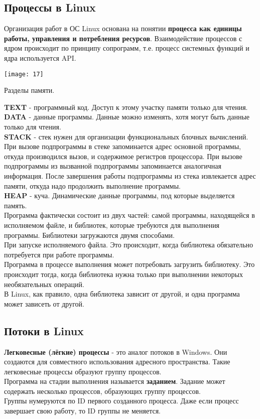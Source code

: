 \documentclass[a4paper]{article}
\begin{document}
\subsection{Процессы в Linux}
Организация работ в ОС Linux основана на понятии \textbf{процесса как единицы работы, управления и потребления ресурсов}. Взаимодействие процессов с ядром происходит по принципу сопрограмм, т.е. процесс системных функций и ядра используется API.\\
\begin{center}
	\texttt{[image: 17]}
\end{center}
\begin{center}
	Разделы памяти.
\end{center}
\textbf{TEXT} - программный код. Доступ к этому участку памяти только для чтения.\\
\textbf{DATA} - данные программы. Данные можно изменять, хотя  могут быть данные только для чтения.\\
\textbf{STACK} - стек нужен для организации функциональных блочных вычислений. При вызове подпрограммы в стеке запоминается адрес основной программы, откуда производился вызов, и содержимое регистров процессора. При вызове подпрограммы из вызванной подпрограммы запоминается аналогичная информация. После завершения работы подпрограммы из стека извлекается адрес памяти, откуда надо продолжить выполнение программы.\\
\textbf{HEAP} - куча. Динамические данные программы, под которые выделяется память.\\
Программа фактически состоит из двух частей: самой программы, находящейся в исполняемом файле, и библиотек, которые требуются для выполнения программы. Библиотеки загружаются двумя способами.\\
При запуске исполняемого файла. Это происходит, когда библиотека обязательно потребуется при работе программы.\\
Программа в процессе выполнения может потребовать загрузить библиотеку. Это происходит тогда, когда библиотека нужна только при выполнении некоторых необязательных операций.\\
В Linux, как правило, одна библиотека зависит от другой, и одна программа может зависеть от другой.\\
\subsection{Потоки в Linux}
\textbf{Легковесные (лёгкие) процессы} - это аналог потоков в Windows. Они создаются для совместного использования адресного пространства. Такие легковесные процессы образуют группу процессов.\\
Программа на стадии выполнения называется \textbf{заданием}. Задание может содержать несколько процессов, образующих группу процессов.\\
Группы нумеруются по ID первого созданного процесса. Даже если процесс завершает свою работу, то ID группы не меняется.\\
\end{document}
